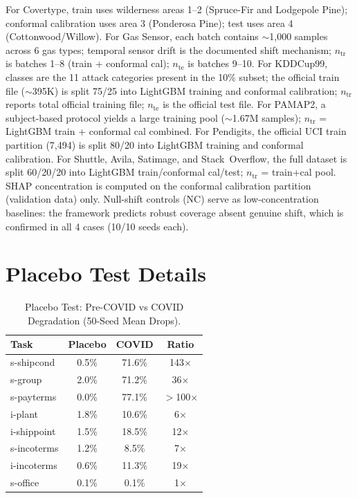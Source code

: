 \documentclass{uai2026} %
\begin{document}
\begin{table}[htbp]
\raggedright
\footnotesize
For Covertype, train uses wilderness areas 1--2 (Spruce-Fir and Lodgepole Pine); conformal calibration uses area 3 (Ponderosa Pine); test uses area 4 (Cottonwood/Willow). For Gas Sensor, each batch contains $\sim$1{,}000 samples across 6 gas types; temporal sensor drift is the documented shift mechanism; $n_\text{tr}$ is batches 1--8 (train + conformal cal); $n_\text{te}$ is batches 9--10. For KDDCup99, classes are the 11 attack categories present in the 10\% subset; the official train file ($\sim$395K) is split 75/25 into LightGBM training and conformal calibration; $n_\text{tr}$ reports total official training file; $n_\text{te}$ is the official test file. For PAMAP2, a subject-based protocol yields a large training pool ($\sim$1.67M samples); $n_\text{tr}$ = LightGBM train + conformal cal combined. For Pendigits, the official UCI train partition (7,494) is split 80/20 into LightGBM training and conformal calibration. For Shuttle, Avila, Satimage, and Stack~Overflow, the full dataset is split 60/20/20 into LightGBM train/conformal cal/test; $n_\text{tr}$ = train+cal pool. SHAP concentration is computed on the conformal calibration partition (validation data) only. Null-shift controls (NC) serve as low-concentration baselines: the framework predicts robust coverage absent genuine shift, which is confirmed in all 4 cases (10/10 seeds each).
\end{table}

\section{Placebo Test Details}\label{app:placebo}

\begin{table}[htbp]
\centering
\caption{Placebo Test: Pre-COVID vs COVID Degradation (50-Seed Mean Drops).}\label{tab:placebo}
\begin{tabular}{lccc}
\toprule
Task & Placebo & COVID & Ratio \\
\midrule
s-shipcond & 0.5\% & 71.6\% & 143$\times$ \\
s-group & 2.0\% & 71.2\% & 36$\times$ \\
s-payterms & 0.0\% & 77.1\% & $>$100$\times$ \\
i-plant & 1.8\% & 10.6\% & 6$\times$ \\
i-shippoint & 1.5\% & 18.5\% & 12$\times$ \\
s-incoterms & 1.2\% & 8.5\% & 7$\times$ \\
i-incoterms & 0.6\% & 11.3\% & 19$\times$ \\
s-office & 0.1\% & 0.1\% & 1$\times$ \\
\bottomrule
\end{tabular}
\end{table}
\end{document}
